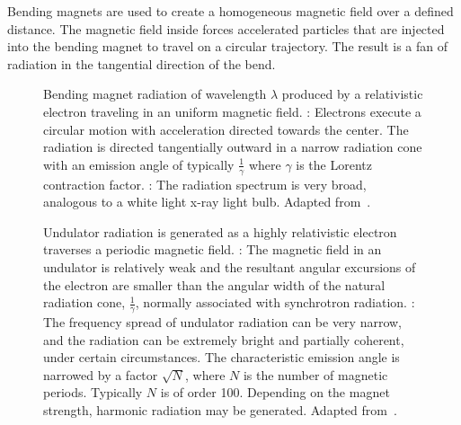 Bending magnets are used to create a homogeneous magnetic field over a defined distance. The magnetic field inside forces accelerated particles that are injected into the bending magnet to travel on a circular trajectory. The result is a fan of radiation in the tangential direction of the bend.

\begin{figure}%
	\noindent{}
	\caption[Bending magnet radiation]{Bending magnet radiation of wavelength $\lambda$ produced by a relativistic electron traveling in an uniform magnetic field. %
		: Electrons execute a circular motion with acceleration directed towards the center. The radiation is directed tangentially outward in a narrow radiation cone with an emission angle of typically $\frac{1}{\gamma}$ where $\gamma$ is the Lorentz contraction factor. %
		: The radiation spectrum is very broad, analogous to a white light x-ray light bulb. Adapted from~\cite{Attwood2007}.}%
	\label{fig:bending magnets}
\end{figure}%

\begin{figure}%
	\noindent{}
	\caption[Undulator radiation]{Undulator radiation is generated as a highly relativistic electron traverses a periodic magnetic field. : The magnetic field in an undulator is relatively weak and the resultant angular excursions of the electron are smaller than the angular width of the natural radiation cone, $\frac{1}{\gamma}$, normally associated with synchrotron radiation. : The frequency spread of undulator radiation can be very narrow, and the radiation can be extremely bright and partially coherent, under certain circumstances. The characteristic emission angle is narrowed by a factor $\sqrt N$, where $N$ is the number of magnetic periods. Typically $N$ is of order 100. Depending on the magnet strength, harmonic radiation may be generated. Adapted from~\cite{Attwood2007}.}%
	\label{fig:undulator}%
\end{figure}

